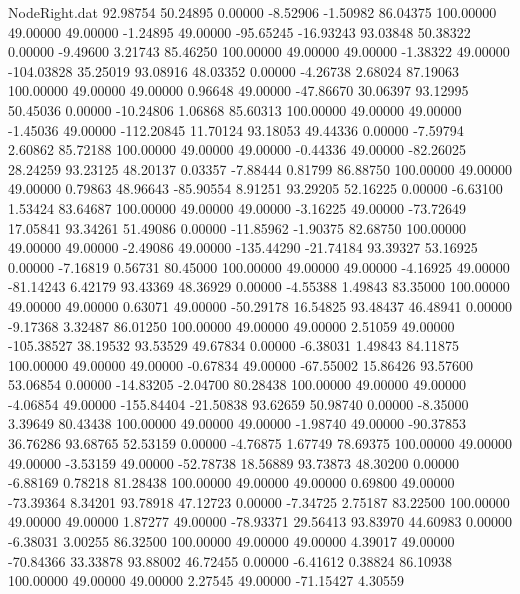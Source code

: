 \begin{filecontents}{NodeRight.dat}
  92.98754   50.24895    0.00000    -8.52906   -1.50982   86.04375  100.00000   49.00000   49.00000   -1.24895   49.00000  -95.65245  -16.93243
  93.03848   50.38322    0.00000    -9.49600    3.21743   85.46250  100.00000   49.00000   49.00000   -1.38322   49.00000 -104.03828   35.25019
  93.08916   48.03352    0.00000    -4.26738    2.68024   87.19063  100.00000   49.00000   49.00000    0.96648   49.00000  -47.86670   30.06397
  93.12995   50.45036    0.00000   -10.24806    1.06868   85.60313  100.00000   49.00000   49.00000   -1.45036   49.00000 -112.20845   11.70124
  93.18053   49.44336    0.00000    -7.59794    2.60862   85.72188  100.00000   49.00000   49.00000   -0.44336   49.00000  -82.26025   28.24259
  93.23125   48.20137    0.03357    -7.88444    0.81799   86.88750  100.00000   49.00000   49.00000    0.79863   48.96643  -85.90554    8.91251
  93.29205   52.16225    0.00000    -6.63100    1.53424   83.64687  100.00000   49.00000   49.00000   -3.16225   49.00000  -73.72649   17.05841
  93.34261   51.49086    0.00000   -11.85962   -1.90375   82.68750  100.00000   49.00000   49.00000   -2.49086   49.00000 -135.44290  -21.74184
  93.39327   53.16925    0.00000    -7.16819    0.56731   80.45000  100.00000   49.00000   49.00000   -4.16925   49.00000  -81.14243    6.42179
  93.43369   48.36929    0.00000    -4.55388    1.49843   83.35000  100.00000   49.00000   49.00000    0.63071   49.00000  -50.29178   16.54825
  93.48437   46.48941    0.00000    -9.17368    3.32487   86.01250  100.00000   49.00000   49.00000    2.51059   49.00000 -105.38527   38.19532
  93.53529   49.67834    0.00000    -6.38031    1.49843   84.11875  100.00000   49.00000   49.00000   -0.67834   49.00000  -67.55002   15.86426
  93.57600   53.06854    0.00000   -14.83205   -2.04700   80.28438  100.00000   49.00000   49.00000   -4.06854   49.00000 -155.84404  -21.50838
  93.62659   50.98740    0.00000    -8.35000    3.39649   80.43438  100.00000   49.00000   49.00000   -1.98740   49.00000  -90.37853   36.76286
  93.68765   52.53159    0.00000    -4.76875    1.67749   78.69375  100.00000   49.00000   49.00000   -3.53159   49.00000  -52.78738   18.56889
  93.73873   48.30200    0.00000    -6.88169    0.78218   81.28438  100.00000   49.00000   49.00000    0.69800   49.00000  -73.39364    8.34201
  93.78918   47.12723    0.00000    -7.34725    2.75187   83.22500  100.00000   49.00000   49.00000    1.87277   49.00000  -78.93371   29.56413
  93.83970   44.60983    0.00000    -6.38031    3.00255   86.32500  100.00000   49.00000   49.00000    4.39017   49.00000  -70.84366   33.33878
  93.88002   46.72455    0.00000    -6.41612    0.38824   86.10938  100.00000   49.00000   49.00000    2.27545   49.00000  -71.15427    4.30559

\end{filecontents}
